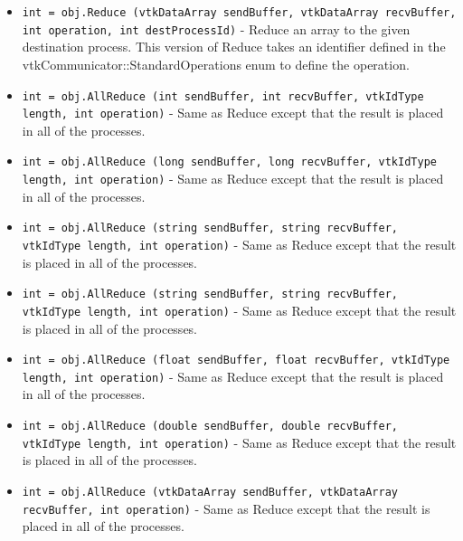 \begin{itemize}
\item  \verb|int = obj.Reduce (vtkDataArray sendBuffer, vtkDataArray recvBuffer, int operation, int destProcessId)| -  Reduce an array to the given destination process.  This version of Reduce
 takes an identifier defined in the
 vtkCommunicator::StandardOperations enum to define the operation.

\item  \verb|int = obj.AllReduce (int sendBuffer, int recvBuffer, vtkIdType length, int operation)| -  Same as Reduce except that the result is placed in all of the processes.

\item  \verb|int = obj.AllReduce (long sendBuffer, long recvBuffer, vtkIdType length, int operation)| -  Same as Reduce except that the result is placed in all of the processes.

\item  \verb|int = obj.AllReduce (string sendBuffer, string recvBuffer, vtkIdType length, int operation)| -  Same as Reduce except that the result is placed in all of the processes.

\item  \verb|int = obj.AllReduce (string sendBuffer, string recvBuffer, vtkIdType length, int operation)| -  Same as Reduce except that the result is placed in all of the processes.

\item  \verb|int = obj.AllReduce (float sendBuffer, float recvBuffer, vtkIdType length, int operation)| -  Same as Reduce except that the result is placed in all of the processes.

\item  \verb|int = obj.AllReduce (double sendBuffer, double recvBuffer, vtkIdType length, int operation)| -  Same as Reduce except that the result is placed in all of the processes.

\item  \verb|int = obj.AllReduce (vtkDataArray sendBuffer, vtkDataArray recvBuffer, int operation)| -  Same as Reduce except that the result is placed in all of the processes.

\end{itemize}
